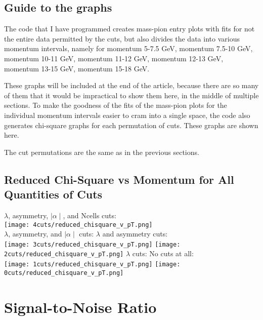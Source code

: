\documentclass[11pt]{article}
\begin{document}
\subsection{Guide to the graphs} %
The code that I have programmed creates mass-pion entry plots with fits for not the entire data permitted by the cuts, but also divides the data into various momentum intervals, namely for momentum 5-7.5 GeV, momentum 7.5-10 GeV, momentum 10-11 GeV, momentum 11-12 GeV, momentum 12-13 GeV, momentum 13-15 GeV, momentum 15-18 GeV.

These graphs will be included at the end of the article, because there are so many of them that it would be impractical  to show them here, in the middle of multiple sections. To make the goodness of the fits of the mass-pion plots for the individual momentum intervals easier to cram into a single space, the code also generates chi-square graphs for each permutation of cuts. These graphs are shown here.

The cut permutations are the same as in the previous sections.

\subsection{Reduced Chi-Square vs Momentum for  All Quantities of Cuts} %
\begin{frame}{}
$\lambda$, asymmetry, $\mid\alpha\mid$, and Ncells cuts:\\
\texttt{[image: 4cuts/reduced\_chisquare\_v\_pT.png]}\\
$\lambda$, asymmetry, and $\mid\alpha\mid$ cuts:
\noindent\hspace{3 cm}$\lambda$ and asymmetry cuts:\\
\texttt{[image: 3cuts/reduced\_chisquare\_v\_pT.png]}
\texttt{[image: 2cuts/reduced\_chisquare\_v\_pT.png]}
$\lambda$  cuts:
\noindent\hspace{4 cm} No cuts at all:\\
\texttt{[image: 1cuts/reduced\_chisquare\_v\_pT.png]}
\texttt{[image: 0cuts/reduced\_chisquare\_v\_pT.png]}
\end{frame}

\section{Signal-to-Noise Ratio}
\end{document}
